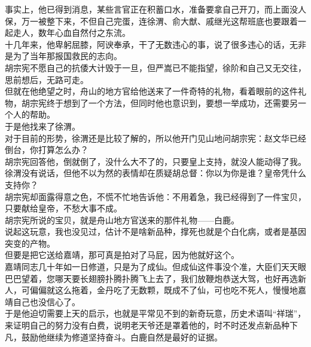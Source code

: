\begin{multicols}{\theparacolNo}
事实上，他已得到消息，某些言官正在积蓄口水，准备要拿自己开刀，而上面没人保，万一被整下来，不但自己完蛋，连徐渭、俞大猷、戚继光这帮班底也要跟着一起走人，数年心血自然付之东流。\\

十几年来，他卑躬屈膝，阿谀奉承，干了无数违心的事，说了很多违心的话，无非是为了当年那报国救民的志向。\\

胡宗宪不愿自己的抗倭大计毁于一旦，但严嵩已不能指望，徐阶和自己又无交往，思前想后，无路可走。\\

但就在他绝望之时，舟山的地方官给他送来了一件奇特的礼物，看着眼前的这件礼物，胡宗宪终于想到了一个方法，但同时他也意识到，要想一举成功，还需要另一个人的帮助。\\

于是他找来了徐渭。\\

对于目前的形势，徐渭还是比较了解的，所以他开门见山地问胡宗宪：赵文华已经倒台，你打算怎么办？\\

胡宗宪回答他，倒就倒了，没什么大不了的，只要皇上支持，就没人能动得了我。\\

徐渭没有说话，但他不以为然的表情却在质疑胡总督：你以为你是谁？皇帝凭什么支持你？\\

胡宗宪却面露得意之色，不慌不忙地告诉他：不用着急，我已经得到了一件宝贝，只要献给皇帝，不愁大事不成。\\

胡宗宪所说的宝贝，就是舟山地方官送来的那件礼物——白鹿。\\

说起这玩意，我也没见过，估计不是啥新品种，撑死也就是个白化病，或者是基因突变的产物。\\

但要是把它送给嘉靖，那可真是拍对了马屁，因为他就好这个。\\

嘉靖同志几十年如一日修道，只是为了成仙。但成仙这件事没个准，大臣们天天眼巴巴望着，您哪天要长翅膀扑腾扑腾飞上去了，我们放鞭炮恭送大驾，也好再选新人，可偏偏就这么拖着，金丹吃了无数颗，既成不了仙，可也吃不死人，慢慢地嘉靖自己也没信心了。\\

于是他迫切需要上天的启示，也就是平常见不到的新奇玩意，历史术语叫“祥瑞”，来证明自己的努力没有白费，说明老天爷还是罩着他的，时不时还发点新品种下凡，鼓励他继续为修道坚持奋斗。白鹿自然是最好的证据。\\


\end{multicols}
